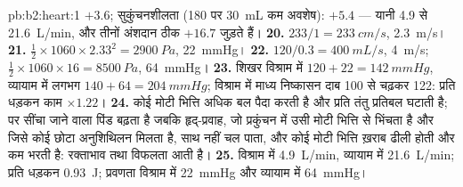 \begin{solution}{pb:b2:heart:1}
$+3.6$; सुकुंचनशीलता (180 पर \qty{30}{mL} कम अवशेष): $+5.4$ ---
यानी 4.9 से \qty{21.6}{L/min}, और तीनों अंशदान ठीक
$+16.7$ जुड़ते हैं।
\textbf{20.} $233/1 = \qty{233}{cm/s}$, \qty{2.3}{m/s}।
\textbf{21.} $\tfrac12\times 1060\times 2.33^{2} = \qty{2900}{Pa}$,
\qty{22}{mmHg}।
\textbf{22.} $120/0.3 = \qty{400}{mL/s}$, \qty{4}{m/s}; $\tfrac12\times
1060\times 16 = \qty{8500}{Pa}$, \qty{64}{mmHg}।
\textbf{23.} शिखर विश्राम में $120 + 22 = \qty{142}{mmHg}$, व्यायाम में लगभग $140 +
64 = \qty{204}{mmHg}$; विश्राम में माध्य निष्कासन दाब
100 से चढ़कर 122: प्रति धड़कन काम $\times 1.22$।
\textbf{24.} कोई मोटी भित्ति अधिक बल पैदा करती है और प्रति तंतु
प्रतिबल घटाती है; पर सींचा जाने वाला पिंड बढ़ता है जबकि
हृद्-प्रवाह, जो प्रकुंचन में उसी मोटी भित्ति से भिंचता है और जिसे कोई
छोटा अनुशिथिलन मिलता है, साथ नहीं चल पाता, और कोई मोटी भित्ति ख़राब
ढीली होती और कम भरती है: रक्ताभाव तथा विफलता आती है।
\textbf{25.} विश्राम में \qty{4.9}{L/min}, व्यायाम में \qty{21.6}{L/min};
प्रति धड़कन \qty{0.93}{J}; प्रवणता विश्राम में \qty{22}{mmHg} और
व्यायाम में \qty{64}{mmHg}।
\end{solution}
